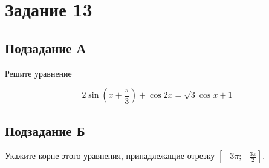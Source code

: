 \section*{Задание 13}

\subsection*{Подзадание А}

Решите уравнение

\[
    2\sin\left(x + \frac{\pi}{3}\right) + \cos{2x} = \sqrt{3}\cos{x} + 1
\]

\subsection*{Подзадание Б}

Укажите корне этого уравнения, принадлежащие отрезку $\left[-3\pi; - \frac{3\pi}{2}\right]$.

